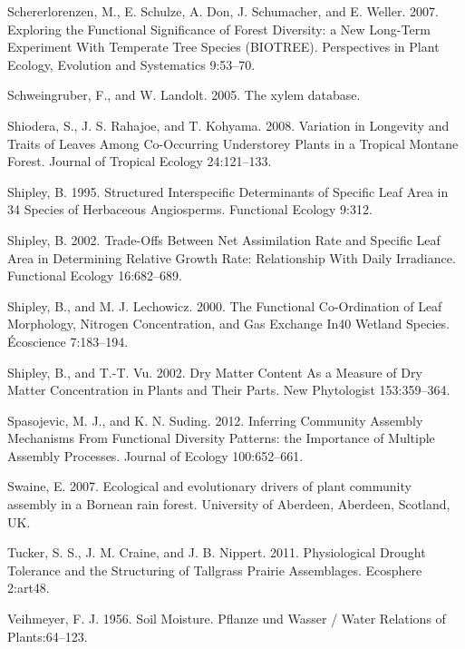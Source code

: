 \documentclass[11pt]{article}
\begin{document}
\begin{hangparas}{1.5em}{1}
\hypertarget{citeproc_bib_item_101}{Schererlorenzen, M., E. Schulze, A. Don, J. Schumacher, and E. Weller. 2007. Exploring the Functional Significance of Forest Diversity: a New Long-Term Experiment With Temperate Tree Species (BIOTREE). Perspectives in Plant Ecology, Evolution and Systematics 9:53–70.}

\hypertarget{citeproc_bib_item_102}{Schweingruber, F., and W. Landolt. 2005. The xylem database.}

\hypertarget{citeproc_bib_item_103}{Shiodera, S., J. S. Rahajoe, and T. Kohyama. 2008. Variation in Longevity and Traits of Leaves Among Co-Occurring Understorey Plants in a Tropical Montane Forest. Journal of Tropical Ecology 24:121–133.}

\hypertarget{citeproc_bib_item_104}{Shipley, B. 1995. Structured Interspecific Determinants of Specific Leaf Area in 34 Species of Herbaceous Angiosperms. Functional Ecology 9:312.}

\hypertarget{citeproc_bib_item_105}{Shipley, B. 2002. Trade-Offs Between Net Assimilation Rate and Specific Leaf Area in Determining Relative Growth Rate: Relationship With Daily Irradiance. Functional Ecology 16:682–689.}

\hypertarget{citeproc_bib_item_106}{Shipley, B., and M. J. Lechowicz. 2000. The Functional Co-Ordination of Leaf Morphology, Nitrogen Concentration, and Gas Exchange In40 Wetland Species. Écoscience 7:183–194.}

\hypertarget{citeproc_bib_item_107}{Shipley, B., and T.-T. Vu. 2002. Dry Matter Content As a Measure of Dry Matter Concentration in Plants and Their Parts. New Phytologist 153:359–364.}

\hypertarget{citeproc_bib_item_108}{Spasojevic, M. J., and K. N. Suding. 2012. Inferring Community Assembly Mechanisms From Functional Diversity Patterns: the Importance of Multiple Assembly Processes. Journal of Ecology 100:652–661.}

\hypertarget{citeproc_bib_item_109}{Swaine, E. 2007. Ecological and evolutionary drivers of plant community assembly in a Bornean rain forest. University of Aberdeen, Aberdeen, Scotland, UK.}

\hypertarget{citeproc_bib_item_110}{Tucker, S. S., J. M. Craine, and J. B. Nippert. 2011. Physiological Drought Tolerance and the Structuring of Tallgrass Prairie Assemblages. Ecosphere 2:art48.}

\hypertarget{citeproc_bib_item_111}{Veihmeyer, F. J. 1956. Soil Moisture. Pflanze und Wasser / Water Relations of Plants:64–123.}


\end{hangparas}
\end{document}
